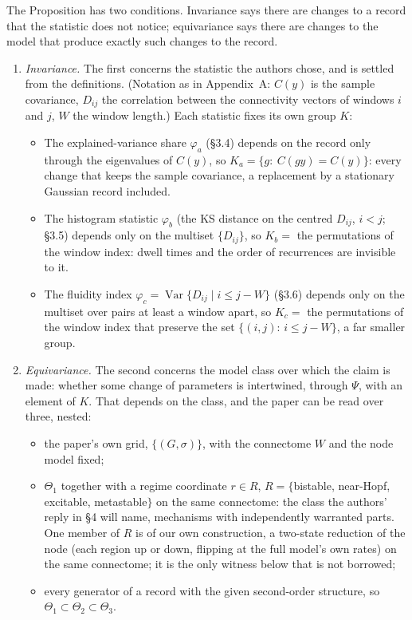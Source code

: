 \documentclass[11pt]{article}
\begin{document}
The Proposition has two conditions. Invariance says there are changes to a record that the statistic does not notice; equivariance says there are changes to the model that produce exactly such changes to the record.
\begin{enumerate}
\item[(i)] \emph{Invariance.} The first concerns the statistic the authors chose, and is settled from the definitions. (Notation as in Appendix~A: $C(y)$ is the sample covariance, $D_{ij}$ the correlation between the connectivity vectors of windows $i$ and $j$, $W$ the window length.) Each statistic fixes its own group $K$:
  \begin{itemize}
  \item[(a)] The explained-variance share $\varphi_a$ (\S3.4) depends on the record only through the eigenvalues of $C(y)$, so
  $K_a=\{g:\ C(gy)=C(y)\}$: every change that keeps the sample covariance, a replacement by a stationary Gaussian record included.
  \item[(b)] The histogram statistic $\varphi_b$ (the KS distance on the centred $D_{ij}$, $i<j$; \S3.5) depends only on the multiset $\{D_{ij}\}$, so
  $K_b=$ the permutations of the window index: dwell times and the order of recurrences are invisible to it.
  \item[(c)] The fluidity index $\varphi_c=\operatorname{Var}\{D_{ij}\mid i\le j-W\}$ (\S3.6) depends only on the multiset over pairs at least a window apart, so
  $K_c=$ the permutations of the window index that preserve the set $\{(i,j):\,i\le j-W\}$, a far smaller group.
  \end{itemize}
\item[(ii)] \emph{Equivariance.} The second concerns the model class over which the claim is made: whether some change of parameters is intertwined, through $\Psi$, with an element of $K$. That depends on the class, and the paper can be read over three, nested:
  \begin{itemize}
  \item[$\Theta_1$] the paper's own grid, $\{(G,\sigma)\}$, with the connectome $W$ and the node model fixed;
  \item[$\Theta_2$] $\Theta_1$ together with a regime coordinate $r\in R$, $R=\{$bistable, near-Hopf, excitable, metastable$\}$ on the same connectome: the class the authors' reply in \S4 will name, mechanisms with independently warranted parts. One member of $R$ is of our own construction, a two-state reduction of the node (each region up or down, flipping at the full model's own rates) on the same connectome; it is the only witness below that is not borrowed;
  \item[$\Theta_3$] every generator of a record with the given second-order structure, so $\Theta_1\subset\Theta_2\subset\Theta_3$.
  \end{itemize}
\end{enumerate}
\end{document}
